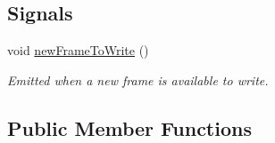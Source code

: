\subsection*{Signals}
\begin{DoxyCompactItemize}
\item 
void \hyperlink{classmdt_tcp_socket_ad8646d441b33bdfb8ddc902ebb136999}{new\-Frame\-To\-Write} ()
\begin{DoxyCompactList}\small\item\em Emitted when a new frame is available to write. \end{DoxyCompactList}\end{DoxyCompactItemize}
\subsection*{Public Member Functions}
